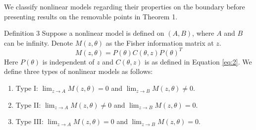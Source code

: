 \documentclass[12pt]{TD-CJS}
\begin{document}
We classify nonlinear models regarding their properties on the boundary before presenting results on the removable points in Theorem 1.

\begin{theorem}{Definition 3}{} Suppose a nonlinear model is defined on $(A,B)$, where $A$ and $B$ can be infinity. Denote $M(z,\theta)$ as the Fisher information matrix at $z$. \[
M(z,\theta)  = P(\theta)C(\theta,z)P(\theta)^T\] Here $P(\theta)$ is independent of $z$ and $C(\theta,z)$ is as defined in Equation \eqref{eq:2}. We define three types of nonlinear models as follows: \begin{enumerate}[(1)]
    \item Type I: $\lim_{z\to A}M(z,\theta)=0$ and $\lim_{z\to B}M(z,\theta)\ne 0$.
    \item Type II: $\lim_{z\to A}M(z,\theta)\ne 0$ and $\lim_{z\to B}M(z,\theta)=0$.
    \item Type III: $\lim_{z\to A}M(z,\theta)= 0$ and $\lim_{z\to B}M(z,\theta)=0$.
   \end{enumerate}
\end{theorem}
\end{document}
